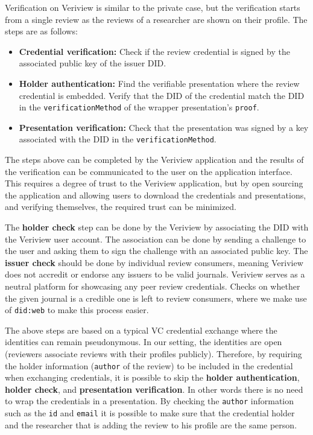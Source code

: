 Verification on Veriview is similar to the private case, but the verification starts from a single review as the reviews of a researcher are shown on their profile. The steps are as follows:

\begin{itemize}

    \item \textbf{Credential verification:} Check if the review credential is signed by the associated public key of the issuer \acrshort{DID}.
    
    \item \textbf{Holder authentication:} Find the verifiable presentation where the review credential is embedded. Verify that the \acrshort{DID} of the credential match the \acrshort{DID} in the \lstinline{verificationMethod} of the wrapper presentation's \lstinline{proof}.
    
    \item \textbf{Presentation verification:} Check that the presentation was signed by a key associated with the \acrshort{DID} in the \lstinline{verificationMethod}.

\end{itemize}

The steps above can be completed by the Veriview application and the results of the verification can be communicated to the user on the application interface. This requires a degree of trust to the Veriview application, but by open sourcing the application and allowing users to download the credentials and presentations, and verifying themselves, the required trust can be minimized. 

The \textbf{holder check} step can be done by the Veriview by associating the \acrshort{DID} with the Veriview user account. The association can be done by sending a challenge to the user and asking them to sign the challenge with an associated public key. The \textbf{issuer check} should be done by individual review consumers, meaning Veriview does not accredit or endorse any issuers to be valid journals. Veriview serves as a neutral platform for showcasing any peer review credentials. Checks on whether the given journal is a credible one is left to review consumers, where we make use of \lstinline{did:web} to make this process easier.

The above steps are based on a typical \acrlong{VC} credential exchange where the identities can remain pseudonymous. In our setting, the identities are open (reviewers associate reviews with their profiles publicly). Therefore, by requiring the holder information (\lstinline{author} of the review) to be included in the credential when exchanging credentials, it is possible to skip the \textbf{holder authentication}, \textbf{holder check}, and \textbf{presentation verification}. In other words there is no need to wrap the credentials in a presentation. By checking the \lstinline{author} information such as the \lstinline{id} and \lstinline{email} it is possible to make sure that the credential holder and the researcher that is adding the review to his profile are the same person.

